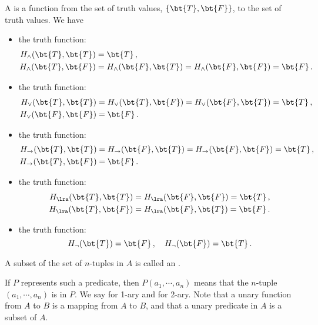 \begin{example}
	A  is a function 
	from the set of truth values, $\{ \bt{T}, \bt{F} \}$, to the 
	set of truth values. We have
	\begin{itemize}
		\item the  truth function:
		\begin{align*}
			H_\land(\bt{T},\bt{T}) &= \bt{T}\,, \\
			H_\land(\bt{T},\bt{F}) &= H_\land(\bt{F},\bt{T})
				= H_\land(\bt{F},\bt{F}) = \bt{F}\,.
		\end{align*}
		\item the  truth function:
		\begin{align*}
			H_\lor(\bt{T},\bt{T}) &= H_\lor(\bt{T},\bt{F})
				= H_\lor(\bt{F},\bt{T}) = \bt{T}\,, \\
			H_\lor(\bt{F},\bt{F}) &= \bt{F}\,.
		\end{align*}
		\item the  truth function:
		\begin{align*}
			H_\to(\bt{T},\bt{T}) &= H_\to(\bt{F},\bt{T})
				= H_\to(\bt{F},\bt{F}) = \bt{T}\,, \\
			H_\to(\bt{T},\bt{F}) &= \bt{F}\,.
		\end{align*}
		\item the  truth function:
		\begin{align*}
			H_\lra(\bt{T},\bt{T}) &= H_\lra(\bt{F},\bt{F})
				= \bt{T}\,, \\
			H_\lra(\bt{T},\bt{F}) &= H_\lra(\bt{F},\bt{T})
				= \bt{F}\,.
		\end{align*}
		\item the  truth function:
		\[
			H_\neg(\bt{T}) = \bt{F}\,,
			\quad 
			H_\neg(\bt{F}) = \bt{T}\,.
		\]
	\end{itemize}
\end{example}

\begin{definition}[Predicate]
	A subset of the set of $n$-tuples in $A$ is called an 
	.
\end{definition}

If $P$ represents such a predicate, then $P(a_1, \cdots, a_n)$ 
means that the $n$-tuple $(a_1, \cdots, a_n)$ is in $P$. We say 
 for 1-ary and  for 2-ary. Note that a unary 
function from $A$ to $B$ is a mapping from $A$ to $B$, and that a 
unary predicate in $A$ is a subset of $A$.

